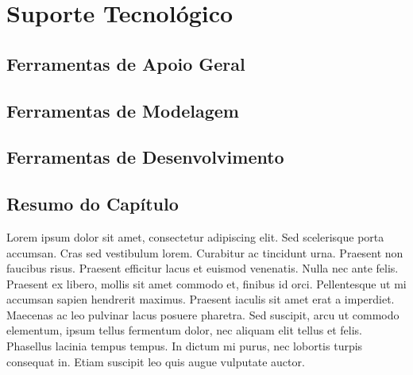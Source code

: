 \chapter{Suporte Tecnológico}
\label{cap-suporte-tecnologico}

\section{Ferramentas de Apoio Geral}
\label{st-tcc}


\section{Ferramentas de Modelagem}
\label{st-modelagem}

\section{Ferramentas de Desenvolvimento}
\label{st-desenvolvimento}

\section{Resumo do Capítulo}
\label{st-resumo}

Lorem ipsum dolor sit amet, consectetur adipiscing elit. Sed scelerisque porta accumsan. Cras sed vestibulum lorem. Curabitur ac tincidunt urna. Praesent non faucibus risus. Praesent efficitur lacus et euismod venenatis. Nulla nec ante felis. Praesent ex libero, mollis sit amet commodo et, finibus id orci. Pellentesque ut mi accumsan sapien hendrerit maximus. Praesent iaculis sit amet erat a imperdiet. Maecenas ac leo pulvinar lacus posuere pharetra. Sed suscipit, arcu ut commodo elementum, ipsum tellus fermentum dolor, nec aliquam elit tellus et felis. Phasellus lacinia tempus tempus. In dictum mi purus, nec lobortis turpis consequat in. Etiam suscipit leo quis augue vulputate auctor.

